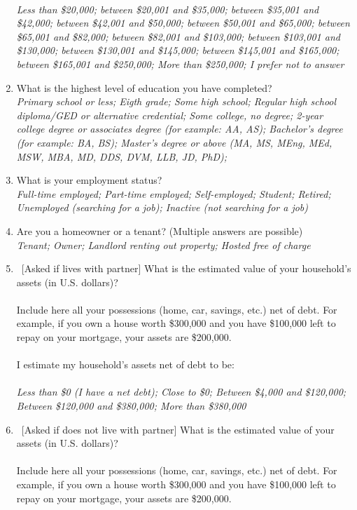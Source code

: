 \begin{enumerate}[resume]
\\ \textit{Less than \$20,000; between \$20,001 and \$35,000; between \$35,001 and \$42,000; between \$42,001 and \$50,000; between \$50,001 and \$65,000; between \$65,001 and \$82,000; between \$82,001 and \$103,000; between \$103,001 and \$130,000; between \$130,001 and \$145,000; between \$145,001 and \$165,000; between \$165,001 and \$250,000; More than \$250,000; I prefer not to answer}
\item What is the highest level of education you have completed? 
\\ \textit{Primary school or less; Eigth grade; Some high school; Regular high school diploma/GED or alternative credential; Some college, no degree; 2-year college degree or associates degree (for example: AA, AS); Bachelor's degree (for example: BA, BS); Master’s degree or above (MA, MS, MEng, MEd, MSW, MBA, MD, DDS, DVM, LLB, JD, PhD); }
\item What is your employment status? \label{item:employment}
\\ \textit{Full-time employed; Part-time employed; Self-employed; Student; Retired; Unemployed (searching for a job); Inactive (not searching for a job)}
\item Are you a homeowner or a tenant? (Multiple answers are possible) 
\\ \textit{Tenant; Owner; Landlord renting out property; Hosted free of charge}
\item ~[Asked if lives with partner] What is the estimated value of your household's assets (in U.S. dollars)?  \\
   \\
Include here all your possessions (home, car, savings, etc.) net of debt. For example, if you own a house worth \$300,000 and you have \$100,000 left to repay on your mortgage, your assets are \$200,000.  \\
  \\
I estimate my household's assets net of debt to be:  \\%
\\  \textit{Less than \$0 (I have a net debt); Close to \$0; Between \$4,000 and \$120,000; Between \$120,000 and \$380,000; More than \$380,000}
\item ~[Asked if does not live with partner] What is the estimated value of your assets (in U.S. dollars)?   \\
   \\
Include here all your possessions (home, car, savings, etc.) net of debt. For example, if you own a house worth \$300,000 and you have \$100,000 left to repay on your mortgage, your assets are \$200,000.  \\

\end{enumerate}
